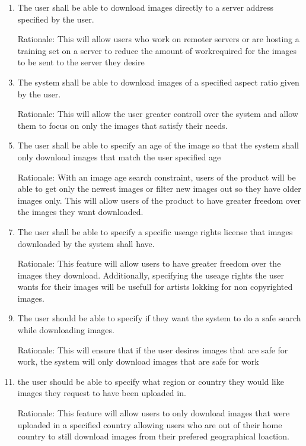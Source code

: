 \documentclass[12pt, titlepage]{article}
\begin{document}
\begin{enumerate}[label=FR\arabic*:, wide=0pt, leftmargin=*]
\item The user shall be able to download images directly to a server address specified by the user.
\item[Rationale:] This will allow users who work on remoter servers or are hosting a training set on a server to reduce the amount of workrequired for the images to be sent to the server they desire
\\
\item The system shall be able to download images of a specified aspect ratio given by the user.
\item[Rationale:] This will allow the user greater controll over the system and allow them to focus on only the images that satisfy their needs.
\\
\item The user shall be able to specify an age of the image so that the system shall only download images that match the user specified age
\item[Rationale:] With an image age search constraint, users of the product will be able to get only the newest images or filter new images out so they have older images only. This will allow users of the product to have greater freedom over the images they want downloaded.
\\
\item The user shall be able to specify a specific useage rights license that images downloaded by the system shall have.
\item[Rationale:] This feature will allow users to have greater freedom over the images they download. Additionally, specifying the useage rights the user wants for their images will be usefull for artists lokking for non copyrighted images.
\\
\item The user should be able to specify if they want the system to do a safe search while downloading images.
\item[Rationale:] This will ensure that if the user desires images that are safe for work, the system will only download images that are safe for work
\\
\item the user should be able to specify what region or country they would like images they request to have been uploaded in.
\item[Rationale:] This feature will allow users to only download images that were uploaded in a specified country allowing users who are out of their home country to still download images from their prefered geographical loaction.
\\

\color{black}

\end{enumerate}
\end{document}
